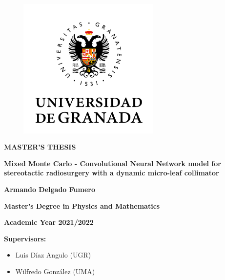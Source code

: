 \documentclass[openany]{article}
\begin{document}

\thispagestyle{empty}    

\begin{titlepage}
\begin{figure}[th]
\begin{flushleft}
    \includegraphics[width=7cm]{ugr.png}
\end{flushleft}
\end{figure}
 \vspace{1cm}

{\flushleft \LARGE \bfseries MASTER'S THESIS\par}\vspace{2cm}

{\flushright \LARGE \bfseries Mixed Monte Carlo - Convolutional Neural Network model for stereotactic radiosurgery with a dynamic micro-leaf collimator  \par}\vspace{2cm}

{\flushleft \LARGE \bfseries Armando Delgado Fumero \par}\vspace{1.5cm}

{\flushleft \bfseries Master’s Degree in Physics and Mathematics \par}\vspace{0.cm}

{\flushleft \small \bfseries Academic Year 2021/2022\par}
{\flushleft \small \bfseries Supervisors:
\begin{itemize}
    \item Luis Díaz Angulo (UGR)
    \item Wilfredo González (UMA)
\end{itemize}}\vspace{2cm}



\end{titlepage}
\end{document}

